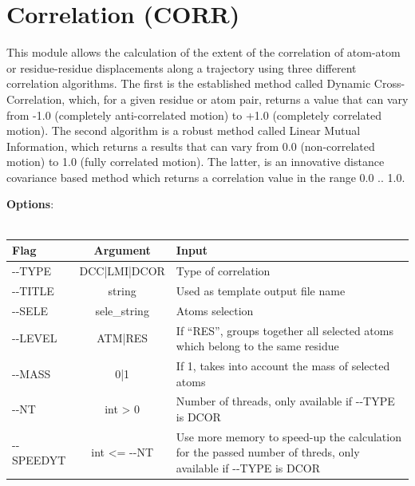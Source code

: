\documentclass[11pt,twoside,onecolumn,a4paper,openright,notitlepage]{book}[2001/04/21]
\begin{document}
\section{Correlation (CORR)}
This module allows the calculation of the extent of the correlation of atom-atom or residue-residue displacements along a trajectory using three different correlation algorithms. The first is the established method called Dynamic Cross-Correlation\cite{mccammon1988dynamics}, which, for a given residue or atom pair, returns a value that can vary from -1.0 (completely anti-correlated motion) to +1.0 (completely correlated motion). The second algorithm is a robust method called Linear Mutual Information\cite{kraskov2004estimating, lange2006generalized}, which returns a results that can vary from 0.0 (non-correlated motion) to 1.0 (fully correlated motion). The latter, is an innovative\cite{dcormethod} distance covariance based method which returns a correlation value in the range 0.0 .. 1.0.

\textbf{\large Options}:\\\\
\begin{tabular}{l|c|p{7.0cm}}
Flag & Argument & Input \\
\hline
-{}-TYPE          & DCC|LMI|DCOR                  & Type of correlation\\
-{}-TITLE         & string                        & Used as template output file name\\
-{}-SELE          & sele\_string                  & Atoms selection\\
-{}-LEVEL         & ATM|RES                       & If ``RES'', groups together all selected atoms which belong to the same residue\\
-{}-MASS          & 0|1                           & If 1, takes into account the mass of selected atoms\\
-{}-NT            & int > 0                       & Number of threads, only available if -{}-TYPE is DCOR\\
-{}-SPEEDYT       & int <= -{}-NT                 & Use more memory to speed-up the calculation for the passed number of threds, only available if -{}-TYPE is DCOR\\
\end{tabular}\\\\
\end{document}
